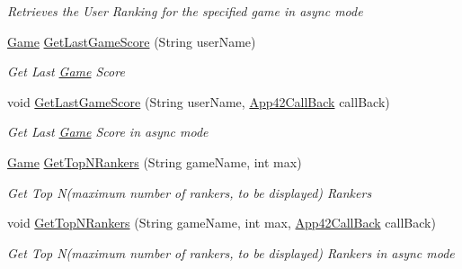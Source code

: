 \begin{DoxyCompactItemize}
\begin{DoxyCompactList}\small\item\em Retrieves the User Ranking for the specified game in async mode \end{DoxyCompactList}\item 
\hyperlink{classcom_1_1shephertz_1_1app42_1_1paas_1_1sdk_1_1csharp_1_1game_1_1_game}{Game} \hyperlink{classcom_1_1shephertz_1_1app42_1_1paas_1_1sdk_1_1csharp_1_1game_1_1_score_board_service_ac43552228db05bf2721e1c59e50be532}{Get\+Last\+Game\+Score} (String user\+Name)
\begin{DoxyCompactList}\small\item\em Get Last \hyperlink{classcom_1_1shephertz_1_1app42_1_1paas_1_1sdk_1_1csharp_1_1game_1_1_game}{Game} Score \end{DoxyCompactList}\item 
void \hyperlink{classcom_1_1shephertz_1_1app42_1_1paas_1_1sdk_1_1csharp_1_1game_1_1_score_board_service_a087c7a9db490c693668b0dce577a5c2a}{Get\+Last\+Game\+Score} (String user\+Name, \hyperlink{interfacecom_1_1shephertz_1_1app42_1_1paas_1_1sdk_1_1csharp_1_1_app42_call_back}{App42\+Call\+Back} call\+Back)
\begin{DoxyCompactList}\small\item\em Get Last \hyperlink{classcom_1_1shephertz_1_1app42_1_1paas_1_1sdk_1_1csharp_1_1game_1_1_game}{Game} Score in async mode \end{DoxyCompactList}\item 
\hyperlink{classcom_1_1shephertz_1_1app42_1_1paas_1_1sdk_1_1csharp_1_1game_1_1_game}{Game} \hyperlink{classcom_1_1shephertz_1_1app42_1_1paas_1_1sdk_1_1csharp_1_1game_1_1_score_board_service_aa91f6175f4f4abfec5d4b7c00449099d}{Get\+Top\+N\+Rankers} (String game\+Name, int max)
\begin{DoxyCompactList}\small\item\em Get Top N(maximum number of rankers, to be displayed) Rankers \end{DoxyCompactList}\item 
void \hyperlink{classcom_1_1shephertz_1_1app42_1_1paas_1_1sdk_1_1csharp_1_1game_1_1_score_board_service_af4f3f44493b1244d11418ed60b117a57}{Get\+Top\+N\+Rankers} (String game\+Name, int max, \hyperlink{interfacecom_1_1shephertz_1_1app42_1_1paas_1_1sdk_1_1csharp_1_1_app42_call_back}{App42\+Call\+Back} call\+Back)
\begin{DoxyCompactList}\small\item\em Get Top N(maximum number of rankers, to be displayed) Rankers in async mode \end{DoxyCompactList}\item 

\end{DoxyCompactItemize}
